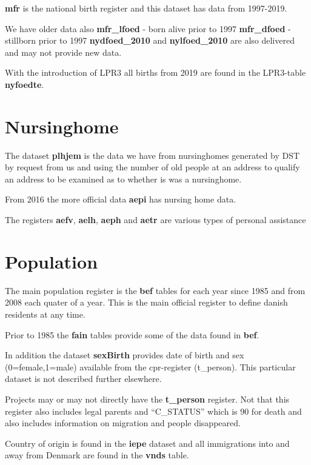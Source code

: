 \documentclass[
]{article}
\begin{document}
\textbf{mfr} is the national birth register and this dataset has data
from 1997-2019.

We have older data also \textbf{mfr\_lfoed} - born alive prior to 1997
\textbf{mfr\_dfoed} - stillborn prior to 1997 \textbf{nydfoed\_2010} and
\textbf{nylfoed\_2010} are also delivered and may not provide new data.

With the introduction of LPR3 all births from 2019 are found in the
LPR3-table \textbf{nyfoedte}.

\hypertarget{nursinghome}{%
\section{Nursinghome}\label{nursinghome}}

The dataset \textbf{plhjem} is the data we have from nursinghomes
generated by DST by request from us and using the number of old people
at an address to qualify an address to be examined as to whether is was
a nursinghome.

From 2016 the more official data \textbf{aepi} has nursing home data.

The registers \textbf{aefv}, \textbf{aelh}, \textbf{aeph} and
\textbf{aetr} are various types of personal assistance

\hypertarget{population}{%
\section{Population}\label{population}}

The main population register is the \textbf{bef} tables for each year
since 1985 and from 2008 each quater of a year. This is the main
official register to define danish residents at any time.

Prior to 1985 the \textbf{fain} tables provide some of the data found in
\textbf{bef}.

In addition the dataset \textbf{sexBirth} provides date of birth and sex
(0=female,1=male) available from the cpr-register (t\_person). This
particular dataset is not described further elsewhere.

Projects may or may not directly have the \textbf{t\_person} register.
Not that this register also includes legal parents and ``C\_STATUS''
which is 90 for death and also includes information on migration and
people disappeared.

Country of origin is found in the \textbf{iepe} dataset and all
immigrations into and away from Denmark are found in the \textbf{vnds}
table.
\end{document}
